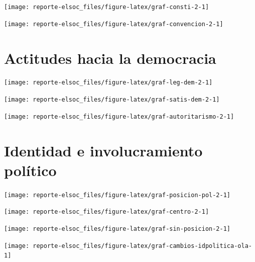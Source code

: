 \documentclass[
  12pt,
]{book}
\begin{document}
\begin{center}\texttt{[image: reporte-elsoc\_files/figure-latex/graf-consti-2-1]} \end{center}

\begin{center}\texttt{[image: reporte-elsoc\_files/figure-latex/graf-convencion-2-1]} \end{center}

\hypertarget{actitudes-hacia-la-democracia}{%
\section{Actitudes hacia la democracia}\label{actitudes-hacia-la-democracia}}

\begin{center}\texttt{[image: reporte-elsoc\_files/figure-latex/graf-leg-dem-2-1]} \end{center}

\begin{center}\texttt{[image: reporte-elsoc\_files/figure-latex/graf-satis-dem-2-1]} \end{center}

\begin{center}\texttt{[image: reporte-elsoc\_files/figure-latex/graf-autoritarismo-2-1]} \end{center}

\hypertarget{identidad-e-involucramiento-poluxedtico}{%
\section{Identidad e involucramiento político}\label{identidad-e-involucramiento-poluxedtico}}

\begin{center}\texttt{[image: reporte-elsoc\_files/figure-latex/graf-posicion-pol-2-1]} \end{center}

\begin{center}\texttt{[image: reporte-elsoc\_files/figure-latex/graf-centro-2-1]} \end{center}

\begin{center}\texttt{[image: reporte-elsoc\_files/figure-latex/graf-sin-posicion-2-1]} \end{center}

\begin{center}\texttt{[image: reporte-elsoc\_files/figure-latex/graf-cambios-idpolitica-ola-1]} \end{center}
\end{document}
